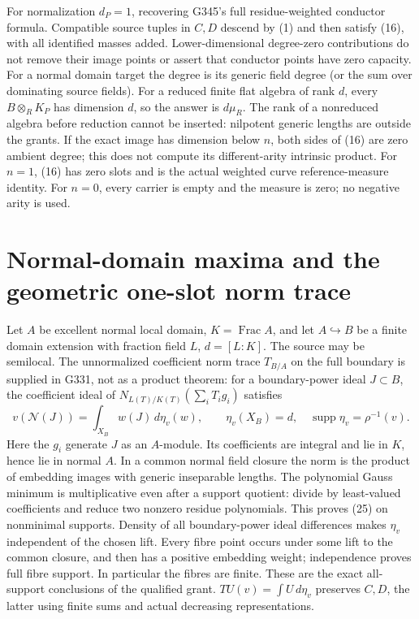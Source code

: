 \documentclass[11pt]{article}
\begin{document}
For normalization \(d_P=1\), recovering G345's full
residue-weighted conductor formula. Compatible source tuples
in \(C,D\) descend by (1) and then satisfy (16), with all
identified masses added. Lower-dimensional degree-zero
contributions do not remove their image points or assert
that conductor points have zero capacity.
For a normal domain target the degree is its generic field
degree (or the sum over dominating source fields).
For a reduced finite flat algebra of rank \(d\), every
\(B\otimes_R K_P\) has dimension \(d\), so the answer is
\(d\mu_R\). The rank of a nonreduced algebra before reduction
cannot be inserted: nilpotent generic lengths are outside
the grants.
If the exact image has dimension below \(n\), both sides of
(16) are zero ambient degree; this does not compute its
different-arity intrinsic product.
For \(n=1\), (16) has zero slots and is the actual weighted
curve reference-measure identity. For \(n=0\), every carrier
is empty and the measure is zero; no negative arity is used.

\section{Normal-domain maxima and the geometric one-slot norm trace}
\label{sec:normal}
Let \(A\) be excellent normal local domain, \(K=\operatorname{Frac}A\),
and let \(A\hookrightarrow B\) be a finite domain extension with
fraction field \(L\), \(d=[L:K]\). The source may be semilocal.
The unnormalized coefficient norm trace \(T_{B/A}\) on the full
boundary is supplied in G331, not as a product theorem:
for a boundary-power ideal \(J\subset B\), the coefficient ideal
of \(N_{L(T)/K(T)}(\sum_iT_i g_i)\) satisfies
\[
 v(\mathcal N(J))=\int_{X_B}w(J)\,d\eta_v(w),\qquad
 \eta_v(X_B)=d,\quad\operatorname{supp}\eta_v=\rho^{-1}(v).
                                                               \tag{25}
\]
Here the \(g_i\) generate \(J\) as an \(A\)-module. Its coefficients
are integral and lie in \(K\), hence lie in normal \(A\).
In a common normal field closure the norm is the product of
embedding images with generic inseparable lengths.
The polynomial Gauss minimum is multiplicative even after a
support quotient: divide by least-valued coefficients and
reduce two nonzero residue polynomials. This proves (25)
on nonminimal supports. Density of all boundary-power ideal
differences makes \(\eta_v\) independent of the chosen lift.
Every fibre point occurs under some lift to the common closure,
and then has a positive embedding weight; independence proves
full fibre support. In particular the fibres are finite.
These are the exact all-support conclusions of the qualified
grant. \(TU(v)=\int U\,d\eta_v\) preserves \(C,D\), the latter
using finite sums and actual decreasing representations.
\end{document}
